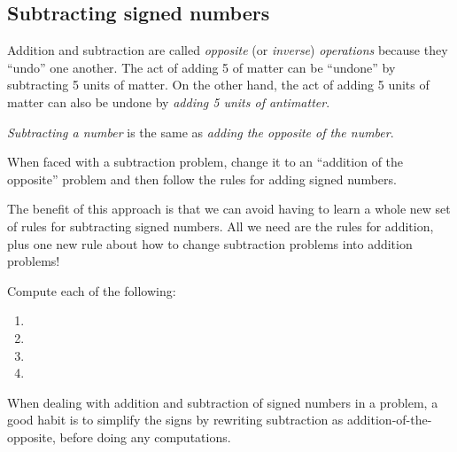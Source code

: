 \subsection{Subtracting signed numbers}

Addition and subtraction are called \textit{opposite} (or \textit{inverse}) \textit{operations} because they ``undo'' one another. The act of adding 5 of matter can be ``undone'' by subtracting 5 units of matter. On the other hand, the act of adding 5 units of matter can also be undone by \textit{adding 5 units of antimatter}.

\begin{boxdef}
\textit{Subtracting a number} is the same as \textit{adding the opposite of the number}.

When faced with a subtraction problem, change it to an ``addition of the opposite'' problem and then follow the rules for adding signed numbers.
\end{boxdef}

The benefit of this approach is that we can avoid having to learn a whole new set of rules for subtracting signed numbers. All we need are the rules for addition, plus one new rule about how to change subtraction problems into addition problems!

\begin{boxex}
Compute each of the following:

\begin{enumerate}[itemsep=10pt]
\item {}

\item {}

\item {}

\item {}
\end{enumerate}
\end{boxex}

When dealing with addition and subtraction of signed numbers in a problem, a good habit is to simplify the signs by rewriting subtraction as addition-of-the-opposite, before doing any computations.

